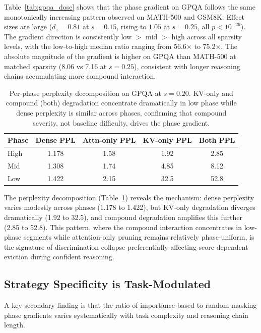 \documentclass[11pt,a4paper]{article}
\begin{document}
Table~\ref{tab:gpqa_dose} shows that the phase gradient on GPQA follows the same monotonically increasing pattern observed on MATH-500 and GSM8K. Effect sizes are large ($d_z=0.81$ at $s=0.15$, rising to $1.05$ at $s=0.25$, all $p<10^{-29}$). The gradient direction is consistently low $>$ mid $>$ high across all sparsity levels, with the low-to-high median ratio ranging from 56.6$\times$ to 75.2$\times$. The absolute magnitude of the gradient is higher on GPQA than MATH-500 at matched sparsity (8.06 vs 7.16 at $s=0.25$), consistent with longer reasoning chains accumulating more compound interaction.

\begin{table}[t]
\centering
\caption{Per-phase perplexity decomposition on GPQA at $s=0.20$. KV-only and compound (both) degradation concentrate dramatically in low phase while dense perplexity is similar across phases, confirming that compound severity, not baseline difficulty, drives the phase gradient.}
\label{tab:gpqa_ppl}
\begin{tabular}{lcccc}
\toprule
Phase & Dense PPL & Attn-only PPL & KV-only PPL & Both PPL \\
\midrule
High & 1.178 & 1.58 & 1.92 & 2.85 \\
Mid & 1.308 & 1.74 & 4.85 & 8.12 \\
Low & 1.422 & 2.15 & 32.5 & 52.8 \\
\bottomrule
\end{tabular}
\end{table}

The perplexity decomposition (Table~\ref{tab:gpqa_ppl}) reveals the mechanism: dense perplexity varies modestly across phases (1.178 to 1.422), but KV-only degradation diverges dramatically (1.92 to 32.5), and compound degradation amplifies this further (2.85 to 52.8). This pattern, where the compound interaction concentrates in low-phase segments while attention-only pruning remains relatively phase-uniform, is the signature of discrimination collapse preferentially affecting score-dependent eviction during confident reasoning.

\subsection{Strategy Specificity is Task-Modulated}

A key secondary finding is that the ratio of importance-based to random-masking phase gradients varies systematically with task complexity and reasoning chain length.
\end{document}
